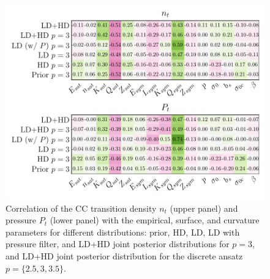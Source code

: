 \begin{figure}[!t]
  \begin{center}
    \includegraphics[width=\linewidth]{figures/corr_ntpt_pars.pdf}
  \end{center}
  \caption[Correlation of the crust-core transition density and pressure with 
  the EoS parameters for different filters]{Correlation of the CC transition 
    density $n_t$ (upper panel) and pressure $P_t$ (lower panel) with the
    empirical, surface, and curvature parameters for different distributions: 
    prior, HD, LD, LD with pressure filter, and LD+HD joint posterior 
    distributions for $p=3$, and LD+HD joint posterior distribution for the 
    discrete ansatz $p=\{2.5,3,3.5\}$.}\label{fig:corr_ntpt_pars}
\end{figure}

